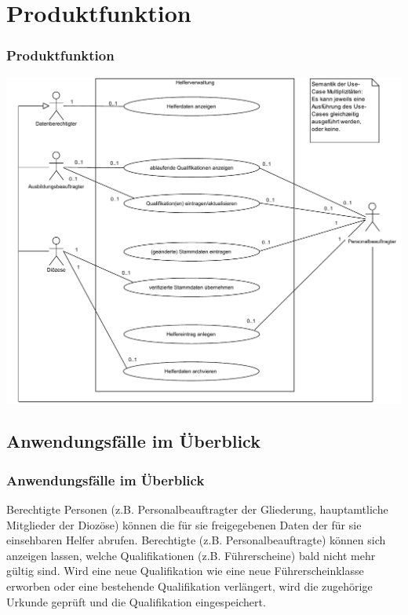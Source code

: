 \documentclass{beamer}
\begin{document}
\section{Produktfunktion}		
\begin{frame}
\frametitle{Produktfunktion}
\includegraphics[height=0.75 \textheight]{PDF/Use_Case.pdf}
\end{frame}

\subsection{Anwendungsfälle im Überblick}		
\begin{frame}
\frametitle{Anwendungsfälle im Überblick}
\begin{acronym}
	 {Berechtigte Personen (z.B. Personalbeauftragter der Gliederung, hauptamtliche Mitglieder der Diozöse) können die für sie freigegebenen Daten der für sie einsehbaren Helfer abrufen.}
	 {Berechtigte (z.B. Personalbeauftragte) können sich anzeigen lassen, welche Qualifikationen (z.B. Führerscheine) bald nicht mehr gültig sind.}
		 {Wird eine neue Qualifikation wie eine neue Führerscheinklasse erworben oder eine bestehende Qualifikation verlängert, wird die zugehörige Urkunde geprüft und die Qualifikation eingespeichert.}
	\end{acronym}
\end{frame}
\end{document}
